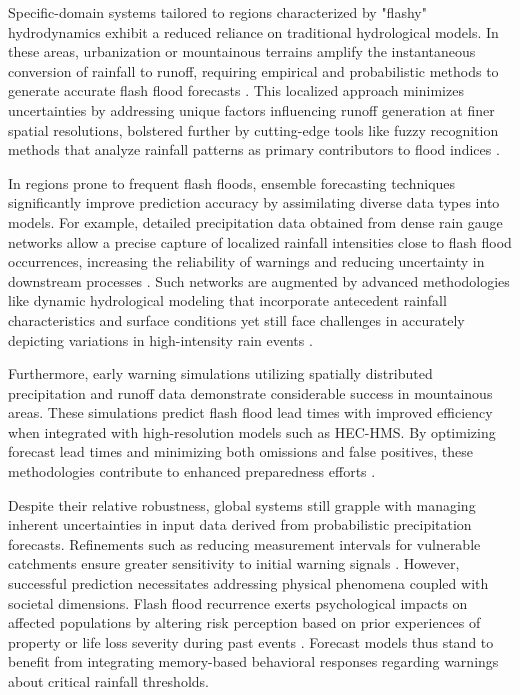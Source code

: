 Specific-domain systems tailored to regions characterized by "flashy" hydrodynamics exhibit a reduced reliance on traditional hydrological models. In these areas, urbanization or mountainous terrains amplify the instantaneous conversion of rainfall to runoff, requiring empirical and probabilistic methods to generate accurate flash flood forecasts \citep{Zanchetta2020}. This localized approach minimizes uncertainties by addressing unique factors influencing runoff generation at finer spatial resolutions, bolstered further by cutting-edge tools like fuzzy recognition methods that analyze rainfall patterns as primary contributors to flood indices \citep{AlRawas2024}.

In regions prone to frequent flash floods, ensemble forecasting techniques significantly improve prediction accuracy by assimilating diverse data types into models. For example, detailed precipitation data obtained from dense rain gauge networks allow a precise capture of localized rainfall intensities close to flash flood occurrences, increasing the reliability of warnings and reducing uncertainty in downstream processes \citep{Filho2021}. Such networks are augmented by advanced methodologies like dynamic hydrological modeling that incorporate antecedent rainfall characteristics and surface conditions yet still face challenges in accurately depicting variations in high-intensity rain events \citep{Liu2018}.

Furthermore, early warning simulations utilizing spatially distributed precipitation and runoff data demonstrate considerable success in mountainous areas. These simulations predict flash flood lead times with improved efficiency when integrated with high-resolution models such as HEC-HMS. By optimizing forecast lead times and minimizing both omissions and false positives, these methodologies contribute to enhanced preparedness efforts \citep{AlRawas2024}.

Despite their relative robustness, global systems still grapple with managing inherent uncertainties in input data derived from probabilistic precipitation forecasts. Refinements such as reducing measurement intervals for vulnerable catchments ensure greater sensitivity to initial warning signals \citep{Archer2024}. However, successful prediction necessitates addressing physical phenomena coupled with societal dimensions. Flash flood recurrence exerts psychological impacts on affected populations by altering risk perception based on prior experiences of property or life loss severity during past events \citep{Zhang2024}. Forecast models thus stand to benefit from integrating memory-based behavioral responses regarding warnings about critical rainfall thresholds.

